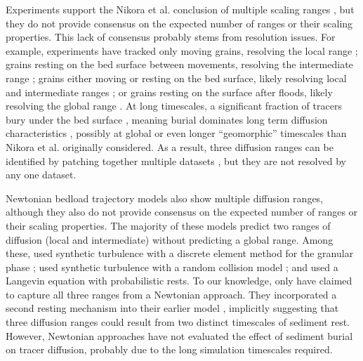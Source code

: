 Experiments support the Nikora et al. conclusion of multiple scaling ranges \citep{Martin2012,Fathel2016}, but they do not provide consensus on the expected number of ranges or their scaling properties.
This lack of consensus probably stems from resolution issues.
For example, experiments have tracked only moving grains, resolving the local range \citep{Furbish2012,Furbish2017,Fathel2016}; grains resting on the bed surface between movements, resolving the intermediate range \citep{Einstein1937,Yano1969,Nakagawa1976}; grains either moving or resting on the bed surface, likely resolving local and intermediate ranges \citep{Martin2012}; or grains resting on the surface after floods, likely resolving the global range \citep{Phillips2013,Bradley2017}. 
At long timescales, a significant fraction of tracers bury under the bed surface \citep{Hassan1991,Hassan2013,Ferguson2002a,Haschenburger2013,Papangelakis2016}, meaning burial dominates long term diffusion characteristics \citep{Bradley2017,Martin2014,Voepel2013}, possibly at global or even longer ``geomorphic'' timescales \citep{Hassan2017} than Nikora et al. originally considered.
As a result, three diffusion ranges can be identified by patching together multiple datasets \citep{Zhang2012,Nikora2002}, but they are not resolved by any one dataset.

Newtonian bedload trajectory models also show multiple diffusion ranges, although they also do not provide consensus on the expected number of ranges or their scaling properties. 
The majority of these models predict two ranges of diffusion (local and intermediate) without predicting a global range.
Among these, \citet{Nikora2001a} used synthetic turbulence \citep{Kraichnan1970} with a discrete element method for the granular phase \citep{Cundall1979a}; \citet{Bialik2012} used synthetic turbulence with a random collision model \citep{Sekine1992}; and \citet{Fan2016} used a Langevin equation with probabilistic rests.
To our knowledge, only \citet{Bialik2015} have claimed to capture all three ranges from a Newtonian approach.
They incorporated a second resting mechanism into their earlier model \citep{Bialik2012}, implicitly suggesting that three diffusion ranges could result from two distinct timescales of sediment rest.
However, Newtonian approaches have not evaluated the effect of sediment burial on tracer diffusion, probably due to the long simulation timescales required. 

